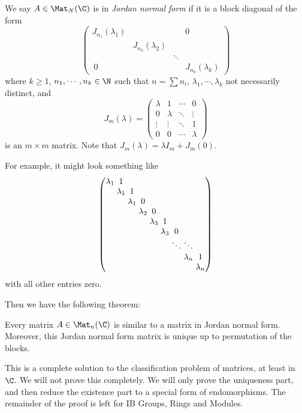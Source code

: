 \documentclass[a4paper]{article}
\begin{document}
\begin{defi}
  We say $A \in \Mat_N(\C)$ is in \emph{Jordan normal form} if it is a block diagonal of the form
  \[
    \begin{pmatrix}
      J_{n_1}(\lambda_1) & & & 0\\
      & J_{n_2}(\lambda_2)\\
      & & \ddots\\\
      0 & & & J_{n_k} (\lambda_k)
    \end{pmatrix}
  \]
  where $k \geq 1$, $n_1, \cdots, n_k \in \N$ such that $n = \sum n_i$, $\lambda_1, \cdots, \lambda_k$ not necessarily distinct, and
  \[
    J_m (\lambda) =
    \begin{pmatrix}
      \lambda & 1 & \cdots & 0\\
      0 & \lambda & \ddots & \vdots\\
      \vdots & \vdots & \ddots & 1\\
      0 & 0 & \cdots & \lambda
    \end{pmatrix}
  \]
  is an $m \times m$ matrix. Note that $J_m(\lambda) = \lambda I_m + J_m(0)$.
\end{defi}
For example, it might look something like
\[\arraycolsep=1.4pt
  \begin{pmatrix}
    \lambda_1 & 1\\
    & \lambda_1 & 1\\
    & & \lambda_1 & 0\\
    & & & \lambda_2 & 0\\
    & & & & \lambda_3 & 1\\
    & & & & & \lambda_3 & 0\\
    & & & & & & \ddots & \ddots\\
    & & & & & & & \lambda_n & 1\\
    & & & & & & & & \lambda_n
  \end{pmatrix}
\]
with all other entries zero.

Then we have the following theorem:
\begin{thm}
  Every matrix $A \in \Mat_n(\C)$ is similar to a matrix in Jordan normal form. Moreover, this Jordan normal form matrix is unique up to permutation of the blocks.
\end{thm}
This is a complete solution to the classification problem of matrices, at least in $\C$. We will not prove this completely. We will only prove the uniqueness part, and then reduce the existence part to a special form of endomorphisms. The remainder of the proof is left for IB Groups, Rings and Modules.
\end{document}

